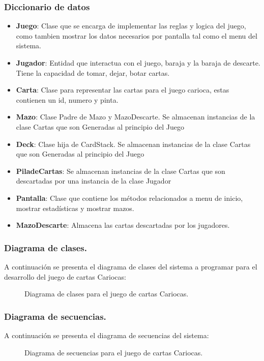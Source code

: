 

\subsubsection{Diccionario de datos}\label{cap:diccionario-datos}
\begin{itemize}
    \item\textbf{Juego}: Clase que se encarga de implementar las reglas y logica del juego, \\como tambien mostrar los datos necesarios por pantalla tal como el menu del sistema. 
    \item\textbf{Jugador}: Entidad que interactua con el juego, baraja y la baraja de descarte. Tiene la capacidad de tomar, dejar, botar cartas.
    \item\textbf{Carta}: Clase para representar las cartas para el juego carioca, estas contienen un id, numero y pinta.
    \item\textbf{Mazo}: Clase Padre de Mazo y MazoDescarte. Se almacenan instancias de la clase Cartas que son Generadas al principio del Juego
    \item\textbf{Deck}: Clase hija de CardStack. Se almacenan instancias de la clase Cartas que son Generadas al principio del Juego
    \item\textbf{PiladeCartas}: Se almacenan instancias de la clase Cartas que son descartadas por una instancia de la clase Jugador
    \item\textbf{Pantalla}: Clase que contiene los métodos relacionados a menu de inicio, mostrar estadísticas y mostrar mazos. 
    \item\textbf{MazoDescarte}: Almacena las cartas descartadas por los jugadores.
\end{itemize}
\clearpage
\subsubsection{Diagrama de clases.}\label{cap:diagrama-clases}
A continuación se presenta el diagrama de clases del sistema a programar para el desarrollo del juego de cartas Cariocas:
\begin{figure}[H]
    \centering
    \caption{Diagrama de clases para el juego de cartas Cariocas.}
\end{figure}

\subsubsection{Diagrama de secuencias.}\label{cap:diagrama-secuencias}
A continuación se presenta el diagrama de secuencias del sistema:
\begin{figure}[H]
    \centering
    \caption{Diagrama de secuencias para el juego de cartas Cariocas.}
\end{figure}

